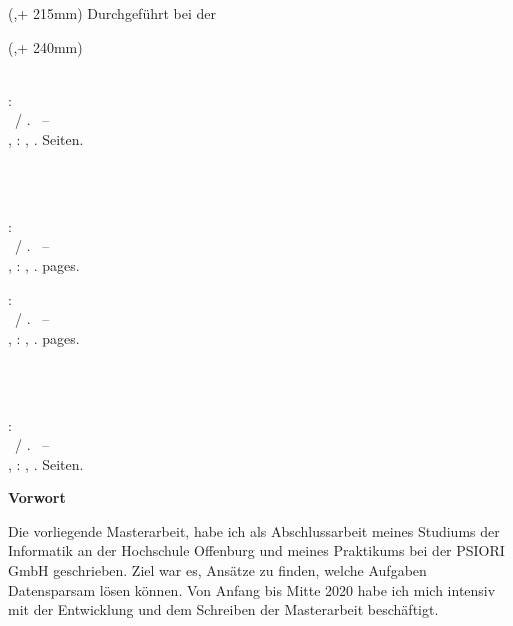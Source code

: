 \begin{textblock*}{\seitenbreite}(\bindekorrektur,\seitenanfang + 215mm)
  \centering\large 
  \textsf{Durchgeführt bei der \hsmafirma}
\end{textblock*}

\begin{textblock*}{\seitenbreite}(\bindekorrektur,\seitenanfang + 240mm)
  \centering\large\sffamily
  \hsmatutor \\
  \vspace{2mm}
  \hsmabetreuer\\
  \vspace{2mm}
  \hsmazweitkorrektor
\end{textblock*}

\null\newpage
\thispagestyle{empty}
  
\newcommand{\hsmabibde}{\begin{small}\textbf{\hsmaautorbib}: \\ \hsmatitelde \ / \hsmaautor. \ -- \\ \hsmatypde, \hsmaort : \hsmakoerperschaftde, \hsmajahr. \pageref{lastpage} Seiten.\end{small}}

\newcommand{\hsmabiben}{\begin{small}\textbf{\hsmaautorbib}: \\ \hsmatitelen \ / \hsmaautor. \ -- \\ \hsmatypen, \hsmaort : \hsmakoerperschaften, \hsmajahr. \pageref{lastpage} pages. \end{small}}

%
  {\hsmabibde \\ \vspace{0.5cm} \\ \hsmabiben}
  {\hsmabiben \\ \vspace{0.5cm} \\ \hsmabibde}


\clearpage\setcounter{page}{1}
\thispagestyle{empty}
\textsf{\large\textbf{Vorwort}}

Die vorliegende Masterarbeit, habe ich als Abschlussarbeit meines Studiums der Informatik an der Hochschule Offenburg und meines Praktikums bei der PSIORI GmbH geschrieben. Ziel war es, Ansätze zu finden, welche Aufgaben Datensparsam lösen können. Von Anfang bis Mitte 2020 habe ich mich intensiv mit der Entwicklung und dem Schreiben der Masterarbeit beschäftigt.

